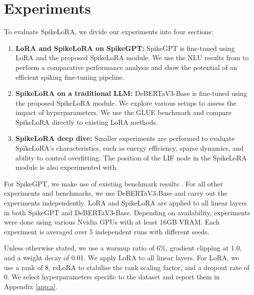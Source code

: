 \documentclass{article} %
\begin{document}
\section{Experiments}
\label{experiments}
To evaluate SpikeLoRA, we divide our experiments into four sections:
\begin{enumerate}
    \item \textbf{LoRA and SpikeLoRA on SpikeGPT:} SpikeGPT is fine-tuned using LoRA and the proposed SpikeLoRA module. We use the NLU results from \citet{zhu_spikegpt_2024-1} to perform a comparative performance analysis and show the potential of an efficient spiking fine-tuning pipeline.
    \item \textbf{SpikeLoRA on a traditional LLM:} DeBERTaV3-Base is fine-tuned using the proposed SpikeLoRA module. We explore various setups to assess the impact of hyperparameters. We use the GLUE \citep{wang_glue_2019-1} benchmark and compare SpikeLoRA directly to existing LoRA methods.
    \item \textbf{SpikeLoRA deep dive:} Smaller experiments are performed to evaluate SpikeLoRA's characteristics, such as energy efficiency, sparse dynamics, and ability to control overfitting. The position of the LIF node in the SpikeLoRA module is also experimented with.
\end{enumerate}
For SpikeGPT, we make use of existing benchmark results \citep{zhu_spikegpt_2024-1}. For all other experiments and benchmarks, we use DeBERTaV3-Base \citep{he_debertav3_2023} and carry out the experiments independently. LoRA and SpikeLoRA are applied to all linear layers in both SpikeGPT and DeBERTaV3-Base. Depending on availability, experiments were done using various Nvidia GPUs with at least 16GB VRAM. Each experiment is averaged over 5 independent runs with different seeds.

Unless otherwise stated, we use a warmup ratio of 6\%, gradient clipping at 1.0, and a weight decay of 0.01. We apply LoRA to all linear layers. For LoRA, we use a rank of 8, rsLoRA \citep{kalajdzievski_rank_2023} to stabilise the rank scaling factor, and a dropout rate of 0. We select hyperparameters specific to the dataset and report them in Appendix \ref{app:a}.
\end{document}
